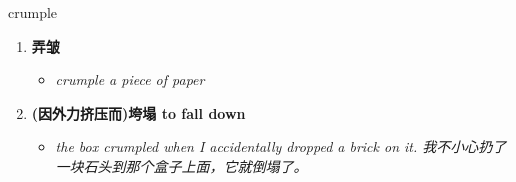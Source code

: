 
\begin{frame}
{\huge crumple}
\begin{center}
\begin{enumerate}\Large
  \item \textbf{弄皱}
  \begin{itemize}
    \item \em{\Large{crumple a piece of paper}}
  \end{itemize}
  \item \textbf{(因外力挤压而)垮塌 to fall down}
  \begin{itemize}
    \item \em{\Large{the box crumpled when I accidentally dropped a brick on it. 我不小心扔了一块石头到那个盒子上面，它就倒塌了。}}
  \end{itemize}
\end{enumerate}
\end{center}
\end{frame}
